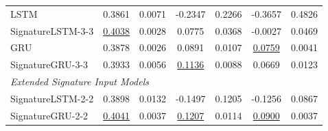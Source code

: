 \begin{table}[htbp]
{\begin{tabular}{lcccccc}
LSTM & 0.3861 & 0.0071 & -0.2347 & 0.2266 & -0.3657 & 0.4826 \\
SignatureLSTM-3-3 & \underline{0.4038} & 0.0028 & 0.0775 & 0.0368 & -0.0027 & 0.0469 \\
GRU & 0.3878 & 0.0026 & 0.0891 & 0.0107 & \underline{0.0759} & 0.0041 \\
SignatureGRU-3-3 & 0.3933 & 0.0056 & \underline{0.1136} & 0.0088 & 0.0669 & 0.0123 \\
\midrule
\multicolumn{7}{l}{\textit{Extended Signature Input Models}} \\
SignatureLSTM-2-2 & 0.3898 & 0.0132 & -0.1497 & 0.1205 & -0.1256 & 0.0867 \\
SignatureGRU-2-2 & \underline{0.4041} & 0.0037 & \underline{0.1207} & 0.0114 & \underline{0.0900} & 0.0037 \\
\bottomrule
\end{tabular}
}
\label{tab:volume_results_with_std}
\end{table}